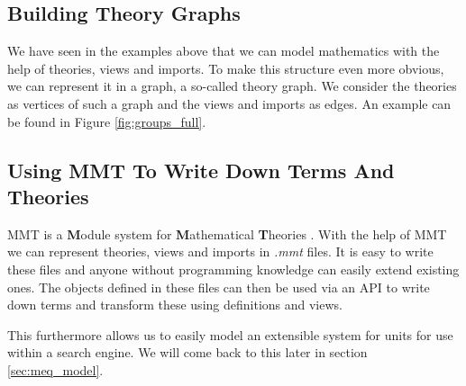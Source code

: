 \subsection{Building Theory Graphs}

We have seen in the examples above that we can model mathematics with the help of theories, views and imports. To make this structure even more obvious, we can represent it in a graph, a so-called theory graph. We consider the theories as vertices of such a graph and the views and imports as edges. An example can be found in Figure \ref{fig:groups_full}.



\subsection{Using MMT To Write Down Terms And Theories}

MMT is a \textbf{M}odule system for \textbf{M}athematical \textbf{T}heories \cite{RabKoh:WSMSML13}. With the help of MMT we can represent theories, views and imports in \textit{.mmt} files. It is easy to write these files and anyone without programming knowledge can easily extend existing ones. The objects defined in these files can then be used via an API to write down terms and transform these using definitions and views.

This furthermore allows us to easily model an extensible system for units for use within a search engine. We will come back to this later in section \ref{sec:meq_model}.

